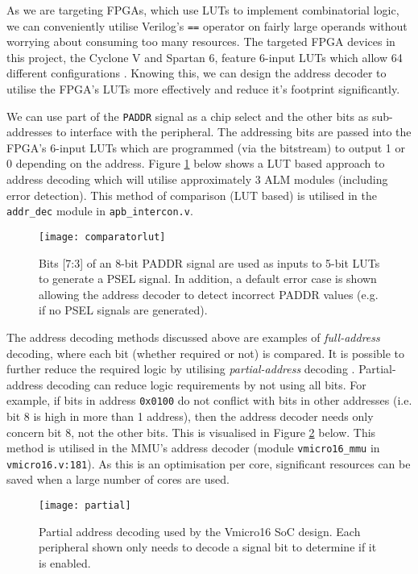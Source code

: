 As we are targeting FPGAs, which use LUTs to implement combinatorial logic, we can conveniently utilise Verilog's \verb|==| operator on fairly large operands without worrying about consuming too many resources. The targeted FPGA devices in this project, the Cyclone V and Spartan 6, feature 6-input LUTs which allow 64 different configurations \cite{s6clb, cvclb}. Knowing this, we can design the address decoder to utilise the FPGA's LUTs more effectively and reduce it's footprint significantly.

We can use part of the \verb|PADDR| signal as a chip select and the other bits as sub-addresses to interface with the peripheral. The addressing bits are passed into the FPGA's 6-input LUTs which are programmed (via the bitstream) to output 1 or 0 depending on the address. Figure \ref{fig:comparatorlut} below shows a LUT based approach to address decoding which will utilise approximately 3 ALM modules (including error detection). This method of comparison (LUT based) is utilised in the \verb|addr_dec| module in \verb|apb_intercon.v|.

\begin{figure}[H]
\centering
\texttt{[image: comparatorlut]}
\caption{Bits [7:3] of an 8-bit PADDR signal are used as inputs to 5-bit LUTs to generate a PSEL signal. In addition, a default error case is shown allowing the address decoder to detect incorrect PADDR values (e.g. if no PSEL signals are generated).}
\label{fig:comparatorlut}
\end{figure}

The address decoding methods discussed above are examples of \textit{full-address} decoding, where each bit (whether required or not) is compared. It is possible to further reduce the required logic by utilising \textit{partial-address} decoding \cite{tanenbaum2016structured}. Partial-address decoding can reduce logic requirements by not using all bits. For example, if bits in address \verb|0x0100| do not conflict with bits in other addresses (i.e. bit 8 is high in more than 1 address), then the address decoder needs only concern bit 8, not the other bits. This is visualised in Figure \ref{fig:partial} below. This method is utilised in the MMU's address decoder (module \verb|vmicro16_mmu| in \verb|vmicro16.v:181|). As this is an optimisation per core, significant resources can be saved when a large number of cores are used.

\begin{figure}[H]
\centering
\texttt{[image: partial]}
\caption{Partial address decoding used by the Vmicro16 SoC design. Each peripheral shown only needs to decode a signal bit to determine if it is enabled.}
\label{fig:partial}
\end{figure}

